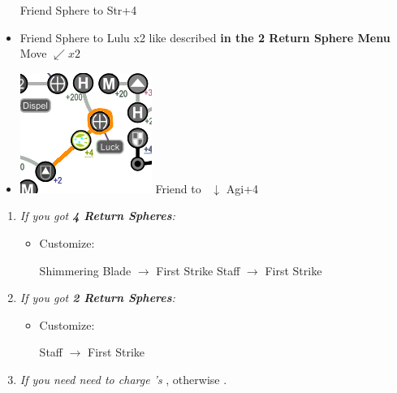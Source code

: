 \begin{spheregrid}
    \begin{itemize}
        \yunaf Friend Sphere to \tidus
        \yunaf Str+4
        \item Friend Sphere to Lulu x2 like described \textbf{in the 2 Return Sphere Menu}
        \kimahrif Move $\swarrow x2$
        \item \includegraphics[width=.25\columnwidth]{graphics/post_BY_0_returns}
        \yunaf Friend to \kimahri\ $\downarrow$
        \yunaf Agi+4
    \end{itemize}
\end{spheregrid}
\begin{enumerate}[resume]
    \item \textit{If you got \textbf{4 Return Spheres}:}
    \begin{itemize}
        \item Customize:
        \begin{itemize}
            \auronf Shimmering Blade $\rightarrow$ First Strike
            \yunaf Staff $\rightarrow$ First Strike
        \end{itemize}
    \end{itemize}
    \item \textit{If you got \textbf{2 Return Spheres}:}
    \begin{itemize}
        \item Customize:
        \begin{itemize}
            \yunaf Staff $\rightarrow$ First Strike
        \end{itemize}
    \end{itemize}
    \bothvfill
    \winvfill
    \lossvfill
    \item \textit{If you need need to charge \rikku's \od} \formation{\tidus}{\rikku}{\auron}, otherwise \formation{\tidus}{\kimahri}{\wakka}.
\end{enumerate}
